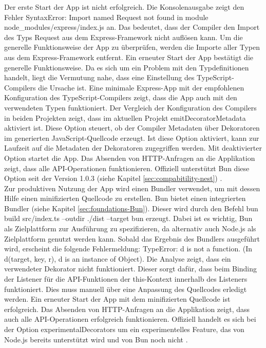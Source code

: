 \noindent
Der erste Start der App ist nicht erfolgreich. Die Konsolenausgabe zeigt den Fehler \glq SyntaxError: Import named Request not found in module node\_modules/express/index.js\grq{} an. Das bedeutet, dass der Compiler den Import des Typs \glq Request\grq{} aus dem Express-Framework nicht auflösen kann. Um die generelle Funktionsweise der App zu überprüfen, werden die Importe aller Typen aus dem Express-Framework entfernt. Ein erneuter Start der App bestätigt die generelle Funktionsweise. Da es sich um ein Problem mit den Typdefinitionen handelt, liegt die Vermutung nahe, dass eine Einstellung des TypeScript-Compilers die Ursache ist. Eine minimale Express-App mit der empfohlenen Konfiguration des TypeScript-Compilers zeigt, dass die App auch mit den verwendeten Typen funktioniert. Der Vergleich der Konfiguration des Compilers in beiden Projekten zeigt, dass im aktuellen Projekt \glq emitDecoratorMetadata\grq{} aktiviert ist. Diese Option steuert, ob der Compiler Metadaten über Dekoratoren im generierten JavaScript-Quellcode erzeugt. Ist diese Option aktiviert, kann zur Laufzeit auf die Metadaten der Dekoratoren zugegriffen werden. Mit deaktivierter Option startet die App. Das Absenden von HTTP-Anfragen an die Applikation zeigt, dass alle API-Operationen funktionieren. Offiziell unterstützt Bun diese Option seit der Version 1.0.3 (siehe Kapitel \ref{sec:compabitility-nest}) \cite{McDonnel.2023}.\\

\noindent
Zur produktiven Nutzung der App wird einen Bundler verwendet, um mit dessen Hilfe einen minifizierten Quellcode zu erstellen. Bun bietet einen integrierten Bundler (siehe Kapitel \ref{sec:foundations-Bun}). Dieser wird durch den Befehl \glq bun build src/index.ts --outdir ./dist --target bun\grq{} erzeugt. Dabei ist es wichtig, Bun als Zielplattform zur Ausführung zu spezifizieren, da alternativ auch Node.js als Zielplattform genutzt werden kann. Sobald das Ergebnis des Bundlers ausgeführt wird, erscheint die folgende Fehlermeldung: \glq TypeError: d is not a function. (In d(target, key, r), d is an instance of Object)\grq{}. Die Analyse zeigt, dass ein verwendeter Dekorator nicht funktioniert. Dieser sorgt dafür, dass beim Binding der Listener für die API-Funktionen  der this-Kontext innerhalb des Listeners funktioniert. Dies muss manuell über eine Anpassung des Quellcodes erledigt werden. Ein erneuter Start der App mit dem minifizierten Quellcode ist erfolgreich. Das Absenden von HTTP-Anfragen an die Applikation zeigt, dass auch alle API-Operationen erfolgreich funktionieren. Offiziell handelt es sich bei der Option \glq experimentalDecorators\grq{} um ein experimentelles Feature, das von Node.js bereits unterstützt wird und von Bun noch nicht \cite{Microsoft.2023}.

